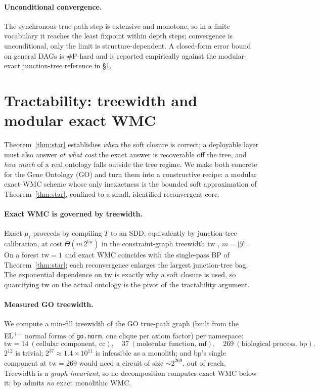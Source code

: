 \documentclass[anon]{nesy2026}
\newcommand{\tw}{\ensuremath{\mathrm{tw}}}
\begin{document}
\paragraph{Unconditional convergence.}
The synchronous true-path step is extensive and monotone, so in a finite vocabulary it reaches the least fixpoint within $\mathrm{depth}$ steps; convergence is unconditional, only the limit is structure-dependent. A closed-form error bound on general DAGs is \#P-hard and is reported empirically against the modular-exact junction-tree reference in \S\ref{sec:scaling}.

\section{Tractability: treewidth and modular exact WMC}\label{sec:scaling}
Theorem~\ref{thm:star} establishes \emph{when} the soft closure is correct; a deployable layer must also answer \emph{at what cost} the exact answer is recoverable off the tree, and \emph{how much} of a real ontology falls outside the tree regime. We make both concrete for the Gene Ontology (GO) and turn them into a constructive recipe: a modular exact-WMC scheme whose only inexactness is the bounded soft approximation of Theorem~\ref{thm:star}, confined to a small, identified reconvergent core.

\paragraph{Exact WMC is governed by treewidth.}
Exact $\mu_i$ proceeds by compiling $T$ to an SDD, equivalently by junction-tree calibration, at cost $\Theta(m\,2^{\tw})$ in the constraint-graph treewidth $\tw$ \citep{darwiche2011sdd,darwiche2002kcmap,bodlaender1993treewidth}, $m=|\mathcal Y|$. On a forest $\tw=1$ and exact WMC coincides with the single-pass BP of Theorem~\ref{thm:star}; each reconvergence enlarges the largest junction-tree bag. The exponential dependence on $\tw$ is exactly why a soft closure is used, so quantifying $\tw$ on the actual ontology is the pivot of the tractability argument.

\paragraph{Measured GO treewidth.}
We compute a min-fill treewidth of the GO true-path graph (built from the EL\textsuperscript{++} normal forms of \texttt{go.norm}, one clique per axiom factor) per namespace:
\[
\tw = 14~(\text{cellular component, cc}),\quad
37~(\text{molecular function, mf}),\quad
269~(\text{biological process, bp}).
\]
$2^{12}$ is trivial; $2^{37}\!\approx\!1.4\times10^{11}$ is infeasible as a monolith; and bp's single component at $\tw=269$ would need a circuit of size ${\sim}2^{269}$, out of reach. Treewidth is a \emph{graph invariant}, so no decomposition computes exact WMC below it: bp admits \emph{no} exact monolithic WMC.
\end{document}
